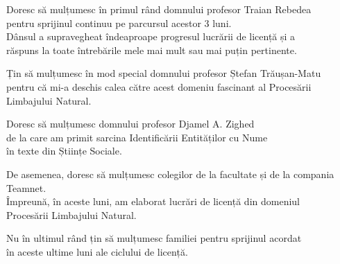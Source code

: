 \vspace*{7cm}
\begin{center}
Doresc să mulțumesc în primul rând domnului profesor Traian Rebedea\\
pentru sprijinul continuu pe parcursul acestor 3 luni.\\
Dânsul a supravegheat îndeaproape progresul lucrării de licență și a\\
răspuns la toate întrebările mele mai mult sau mai puțin pertinente.
\end{center}

\vspace{0.6cm}
\begin{center}
Țin să mulțumesc în mod special domnului profesor Ștefan Trăușan-Matu\\
pentru că mi-a deschis calea către acest domeniu fascinant al Procesării Limbajului Natural.
\end{center}

\vspace{0.6cm}
\begin{center}
Doresc să mulțumesc domnului profesor Djamel A. Zighed \\
de la care am primit sarcina Identificării Entităților cu Nume \\
în texte din Științe Sociale.
\end{center}

\vspace{0.6cm}
\begin{center}
De asemenea, doresc să mulțumesc colegilor de la facultate și de la compania Teamnet.\\
Împreună, în aceste luni, am elaborat lucrări de licență din domeniul\\
Procesării Limbajului Natural.
\end{center}


\vspace{0.6cm}
\begin{center}
Nu în ultimul rând țin să mulțumesc familiei pentru sprijinul acordat\\
în aceste ultime luni ale ciclului de licență.
\end{center}
